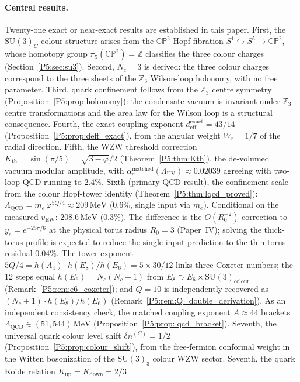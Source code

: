 \documentclass[11pt,a4paper]{article}
\theoremstyle{definition}
\theoremstyle{remark}
\newcommand{\vp}{\varphi}
\newcommand{\vEW}{v_{\mathrm{EW}}}
\newcommand{\LUV}{\Lambda_{\mathrm{UV}}}
\newcommand{\LQCD}{\Lambda_{\mathrm{QCD}}}
\newcommand{\deff}{d_{\mathrm{eff}}}
\begin{document}
\paragraph{Central results.}
Twenty-one exact or near-exact results are established in this paper.
First, the $\mathrm{SU}(3)_C$ colour structure arises from the
$\mathbb{CP}^2$ Hopf fibration $S^1\hookrightarrow S^5\to\mathbb{CP}^2$,
whose homotopy group $\pi_5(\mathbb{CP}^2)=\mathbb{Z}$ classifies the
three colour charges (Section~\ref{P5:sec:su3}).
Second, $N_c=3$ is derived: the three colour charges correspond to the
three sheets of the $\mathbb{Z}_3$ Wilson-loop holonomy, with no free parameter.
Third, quark confinement follows from the $\mathbb{Z}_3$ centre symmetry
(Proposition~\ref{P5:prop:holonomy}): the condensate vacuum is invariant under
$\mathbb{Z}_3$ centre transformations and the area law for the Wilson loop
is a structural consequence.
Fourth, the exact coupling exponent
$\deff^{\mathrm{exact}}=43/14$ (Proposition~\ref{P5:prop:deff_exact}),
from the angular weight $W_r=1/7$ of the radial direction.
Fifth, the WZW threshold correction
$K_{\mathrm{th}}=\sin(\pi/5)=\sqrt{3-\vp}/2$ (Theorem~\ref{P5:thm:Kth}),
the de-volumed vacuum modular amplitude, with
$\alpha_s^{\mathrm{matched}}(\LUV)\approx0.02039$ agreeing with
two-loop QCD running to $2.4\%$.
Sixth (primary QCD result), the confinement scale
from the colour Hopf-tower identity (Theorem~\ref{P5:thm:lqcd_proved}):
$\LQCD = m_e\,\vp^{5Q/4}\approx209\,\mathrm{MeV}$ ($0.6\%$, single input via $m_e$).
Conditional on the measured $\vEW$: $208.6\,\mathrm{MeV}$ ($0.3\%$).
The difference is the $O(R_0^{-2})$ correction to $y_e=e^{-25\pi/6}$
at the physical torus radius $R_0=3$ (Paper~IV); solving the thick-torus profile
is expected to reduce the single-input prediction to the thin-torus residual $0.04\%$.
The tower exponent $5Q/4 = h(A_4)\cdot h(E_8)/h(E_6) = 5\times30/12$
links three Coxeter numbers; the 12 steps equal $h(E_6)=N_c(N_c+1)$
from $E_8\supset E_6\times\mathrm{SU}(3)_{\mathrm{colour}}$
(Remark~\ref{P5:rem:e6_coxeter}); and $Q=10$ is independently recovered
as $(N_c+1)\cdot h(E_8)/h(E_6)$ (Remark~\ref{P5:rem:Q_double_derivation}).
As an independent consistency check, the matched coupling exponent $A\approx44$
brackets $\LQCD\in(51,544)\,\mathrm{MeV}$
(Proposition~\ref{P5:prop:lqcd_bracket}).
Seventh, the universal quark colour level shift
$\delta n^{(C)}=1/2$ (Proposition~\ref{P5:prop:colour_shift}),
from the free-fermion conformal weight in the Witten bosonization of
the $\mathrm{SU}(3)_3$ colour WZW sector.
Seventh, the quark Koide relation $K_{\mathrm{up}}=K_{\mathrm{down}}=2/3$
\end{document}
